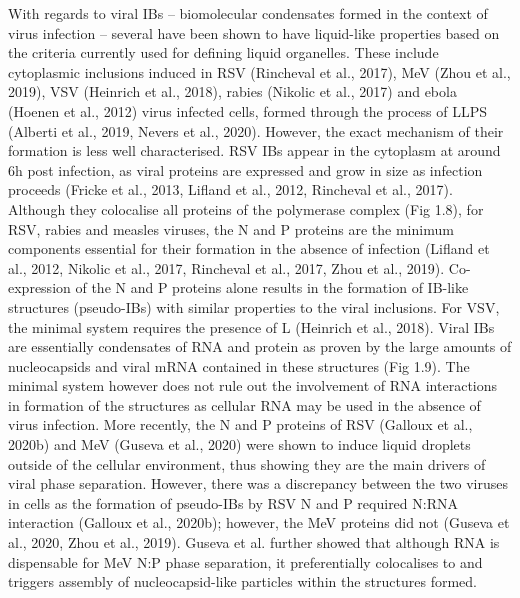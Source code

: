 With regards to viral IBs – biomolecular condensates formed in the context of virus infection – several have been shown to have liquid-like properties based on the criteria currently used for defining liquid organelles. These include cytoplasmic inclusions induced in RSV (Rincheval et al., 2017), MeV (Zhou et al., 2019), VSV (Heinrich et al., 2018), rabies (Nikolic et al., 2017) and ebola (Hoenen et al., 2012) virus infected cells, formed through the process of LLPS (Alberti et al., 2019, Nevers et al., 2020). However, the exact mechanism of their formation is less well characterised. RSV IBs appear in the cytoplasm at around 6h post infection, as viral proteins are expressed and grow in size as infection proceeds (Fricke et al., 2013, Lifland et al., 2012, Rincheval et al., 2017). Although they colocalise all proteins of the polymerase complex (Fig 1.8), for RSV, rabies and measles viruses, the N and P proteins are the minimum components essential for their formation in the absence of infection (Lifland et al., 2012, Nikolic et al., 2017, Rincheval et al., 2017, Zhou et al., 2019). Co-expression of the N and P proteins alone results in the formation of IB-like structures (pseudo-IBs) with similar properties to the viral inclusions. For VSV, the minimal system requires the presence of L (Heinrich et al., 2018). Viral IBs are essentially condensates of RNA and protein as proven by the large amounts of nucleocapsids and viral mRNA contained in these structures (Fig 1.9). The minimal system however does not rule out the involvement of RNA interactions in formation of the structures as cellular RNA may be used in the absence of virus infection. More recently, the N and P proteins of RSV (Galloux et al., 2020b) and MeV (Guseva et al., 2020) were shown to induce liquid droplets outside of the cellular environment, thus showing they are the main drivers of viral phase separation. However, there was a discrepancy between the two viruses in cells as the formation of pseudo-IBs by RSV N and P required N:RNA interaction (Galloux et al., 2020b); however, the MeV proteins did not (Guseva et al., 2020, Zhou et al., 2019). Guseva et al. further showed that although RNA is dispensable for MeV N:P phase separation, it preferentially colocalises to and triggers assembly of nucleocapsid-like particles within the structures formed.


